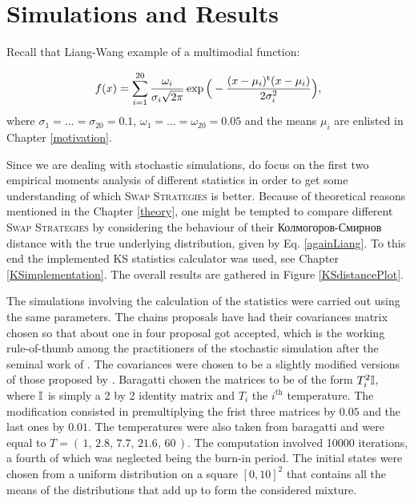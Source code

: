 \chapter{ Simulations and Results }\label{simulationsAndResults}

Recall that Liang-Wang example of a multimodial function:

\begin{equation}\label{againLiang}
f(x) = 
\sum_{i=1}^{20} \frac{\omega_i}{ \sigma_i \sqrt{2 \pi} } \exp \Big( -\frac{(x - \mu_i)^{\mathrm{t}} (x - \mu_i)}{2 \sigma_i^2} \Big),	
\end{equation}
where $\sigma_1 = \dots = \sigma_{20} = 0.1$, $\omega_1 = \dots = \omega_{20} = 0.05 $ and the means $\mu_i$ are enlisted in Chapter \ref{motivation}.

Since we are dealing with stochastic simulations, do focus on the first two empirical moments analysis of different statistics in order to get some understanding of which \textsc{Swap Strategies} is better. 
Because of theoretical reasons mentioned in the Chapter \ref{theory}, one might be tempted to compare different \textsc{Swap Strategies} by considering the behaviour of their Колмогоров-Смирнов distance with the true underlying distribution, given by Eq. \ref{againLiang}. To this end the implemented KS statistics calculator was used, see Chapter \ref{KSimplementation}. The overall results are gathered in Figure \ref{KSdistancePlot}. 

The simulations involving the calculation of the  statistics were carried out using the same parameters. The chains proposals have had their covariances matrix chosen so that about one in four proposal got accepted, which is the working rule-of-thumb among the practitioners of the stochastic simulation after the seminal work of \cite{ Roberts2001}. The covariances were chosen to be a slightly modified versions of those proposed by \cite{BaragattiLikelihoodFreeParallelTempering}.  Baragatti chosen the matrices to be of the form $T_i^2 \mathbb{I}$, where $\mathbb{I}$ is simply a 2 by 2 identity matrix and $T_i$ the $i^\text{th}$ temperature. The modification consisted in premultiplying the frist three matrices by $0.05$ and the last ones by $0.01$. The temperatures were also taken from baragatti and were equal to $T = (\,1,\, 2.8,\, 7.7,\, 21.6,\, 60\,)$. The computation involved 10000 iterations, a fourth of which was neglected being the burn-in period. The initial states were chosen from a uniform distribution on a square $[0,10]^2$ that contains all the means of the distributions that add up to form the considered mixture.


